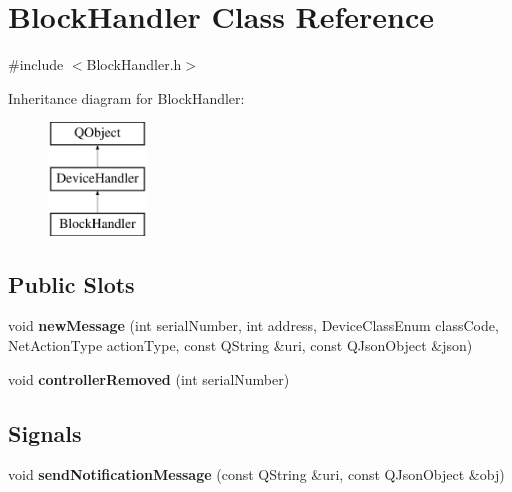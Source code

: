 \hypertarget{class_block_handler}{}\section{Block\+Handler Class Reference}
\label{class_block_handler}


{\ttfamily \#include $<$Block\+Handler.\+h$>$}

Inheritance diagram for Block\+Handler\+:\begin{figure}[H]
\begin{center}
\leavevmode
\includegraphics[height=3.000000cm]{class_block_handler}
\end{center}
\end{figure}
\subsection*{Public Slots}
\begin{DoxyCompactItemize}
\item 
\mbox{\label{class_block_handler_a13cfb11452a98a9d06f502388025ffb1}} 
void {\bfseries new\+Message} (int serial\+Number, int address, Device\+Class\+Enum class\+Code, Net\+Action\+Type action\+Type, const Q\+String \&uri, const Q\+Json\+Object \&json)
\item 
\mbox{\label{class_block_handler_a2d7c23860fd5a31ce9711cb2be3f792a}} 
void {\bfseries controller\+Removed} (int serial\+Number)
\end{DoxyCompactItemize}
\subsection*{Signals}
\begin{DoxyCompactItemize}
\item 
\mbox{\label{class_block_handler_abb88946953c7b564d3dde678cf318eaa}} 
void {\bfseries send\+Notification\+Message} (const Q\+String \&uri, const Q\+Json\+Object \&obj)
\end{DoxyCompactItemize}
